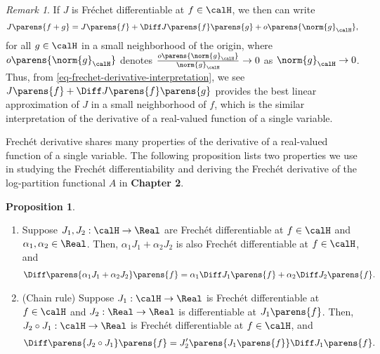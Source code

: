 \documentclass[12pt]{article}
\theoremstyle{definition}
\theoremstyle{theorem}
\newtheorem{proposition}{Proposition}
\theoremstyle{remark}
\newtheorem{remark}{Remark}
\begin{document}
\begin{remark}
	If $J$ is Fr{\'e}chet differentiable at $f \in \calH$, we then can write 
	\begin{align}\label{eq-frechet-derivative-interpretation}
		J \parens{f + g} = J \parens{f} + \Diff J \parens{f} \parens{g} + o \parens{\norm{g}_{\calH}}, 
	\end{align}
	for all $g \in \calH$ in a small neighborhood of the origin, where $o \parens{\norm{g}_{\calH}}$ denotes $\frac{o \parens{\norm{g}_{\calH}}}{\norm{g}_{\calH}} \to 0$ as $\norm{g}_{\calH} \to 0$. Thus, from \eqref{eq-frechet-derivative-interpretation}, we see $J \parens{f} + \Diff J \parens{f} \parens{g}$ provides the best linear approximation of $J$ in a small neighborhood of $f$, which is the similar interpretation of the derivative of a real-valued function of a single variable. 
\end{remark}

Frech{\'e}t derivative shares many properties of the derivative of a real-valued function of a single variable. The following proposition lists two properties we use in studying the Frech{\'e}t differentiability and deriving the Frech{\'e}t derivative of the log-partition functional $A$ in \textbf{\color{red} Chapter 2}. 

\begin{proposition}\label{prop-property-frechet-differentiable}
	\begin{enumerate}[label=(\alph*)]
		\item \label{prop-property-frechet-differentiable-a} Suppose $J_1, J_2: \calH \to \Real$ are Frech{\'e}t differentiable at $f \in \calH$ and $\alpha_1, \alpha_2 \in \Real$. Then, $\alpha_1 J_1 + \alpha_2 J_2$ is also Frech{\'e}t differentiable at $f \in \calH$, and 
		\begin{align*}
			\Diff \parens{\alpha_1 J_1 + \alpha_2 J_2} \parens{f} = \alpha_1 \Diff J_1 \parens{f} + \alpha_2 \Diff J_2 \parens{f}. 
		\end{align*}
		
		\item \label{prop-property-frechet-differentiable-b} (Chain rule) Suppose $J_1: \calH \to \Real$ is Frech{\'e}t differentiable at $f \in \calH$ and $J_2: \Real \to \Real$ is differentiable at $J_1 \parens{f}$. Then, $J_2 \circ J_1: \calH \to \Real$ is Frech{\'e}t differentiable at $f \in \calH$, and 
		\begin{align}
			\Diff \parens{J_2 \circ J_1} \parens{f} = J_2' \parens{J_1 \parens{f}} \Diff J_1 \parens{f}. 
		\end{align}
	\end{enumerate}
\end{proposition}
\end{document}
